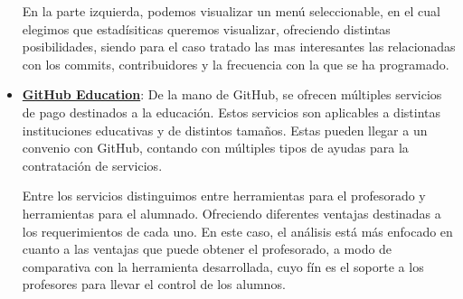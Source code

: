 \begin{itemize}
  En la parte izquierda, podemos visualizar un menú seleccionable, en el
  cual elegimos que estadísiticas queremos visualizar, ofreciendo distintas
  posibilidades, siendo para el caso tratado las mas interesantes las
  relacionadas con los commits, contribuidores y la frecuencia con la que
  se ha programado.

\item \textbf{\href{https://education.github.com}{GitHub Education}}: De la
  mano de GitHub, se ofrecen múltiples servicios de pago destinados a la
  educación. Estos servicios son aplicables a distintas instituciones
  educativas y de distintos tamaños. Estas pueden llegar a un convenio con
  GitHub, contando con múltiples tipos de ayudas para la contratación de
  servicios.

  Entre los servicios distinguimos entre herramientas para el profesorado y
  herramientas para el alumnado. Ofreciendo diferentes ventajas destinadas
  a los requerimientos de cada uno. En este caso, el análisis está más
  enfocado en cuanto a las ventajas que puede obtener el profesorado, a
  modo de comparativa con la herramienta desarrollada, cuyo fín es el
  soporte a los profesores para llevar el control de los alumnos.


\end{itemize}
